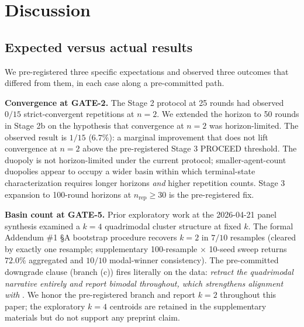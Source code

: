 \section{Discussion}
\label{sec:discussion}

\subsection{Expected versus actual results}
\label{sec:discussion-expected}

We pre-registered three specific expectations and observed three outcomes that differed from them, in each case along a pre-committed path.

\textbf{Convergence at GATE-2.} The Stage 2 protocol at 25 rounds had observed $0/15$ strict-convergent repetitions at $n = 2$. We extended the horizon to 50 rounds in Stage 2b on the hypothesis that convergence at $n = 2$ was horizon-limited. The observed result is $1/15$ ($6.7\%$): a marginal improvement that does not lift convergence at $n = 2$ above the pre-registered Stage 3 PROCEED threshold. The duopoly is not horizon-limited under the current protocol; smaller-agent-count duopolies appear to occupy a wider basin within which terminal-state characterization requires longer horizons \emph{and} higher repetition counts. Stage 3 expansion to 100-round horizons at $n_{\text{rep}} \geq 30$ is the pre-registered fix.

\textbf{Basin count at GATE-5.} Prior exploratory work at the 2026-04-21 panel synthesis examined a $k = 4$ quadrimodal cluster structure at fixed $k$. The formal Addendum \#1 \S A bootstrap procedure recovers $k = 2$ in $7/10$ resamples (cleared by exactly one resample; supplementary 100-resample $\times$ 10-seed sweep returns $72.0\%$ aggregated and $10/10$ modal-winner consistency). The pre-committed downgrade clause (branch (c)) fires literally on the data: \emph{retract the quadrimodal narrative entirely and report bimodal throughout, which strengthens alignment with} \citep{Cao_2026_llm_collusion}. We honor the pre-registered branch and report $k = 2$ throughout this paper; the exploratory $k = 4$ centroids are retained in the supplementary materials but do not support any preprint claim.

